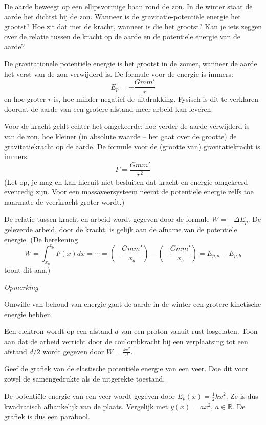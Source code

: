 \documentclass{ximera}
\begin{document}
\begin{exercise}
	De aarde beweegt op een ellipsvormige baan rond de zon. In de winter staat de aarde het dichtst bij de zon. Wanneer is de gravitatie-potentiële energie het grootst? Hoe zit dat met de kracht, wanneer is die het grootst? Kan je iets zeggen over de relatie tussen de kracht op de aarde en de potentiële energie van de aarde?

	\begin{oplossing}
		De gravitationele potentiële energie is het grootst in de zomer, wanneer de aarde het verst van de zon verwijderd is. De formule voor de energie is immers:
		\[
			E_p=-\frac{Gmm'}{r}
		\]
		en hoe groter $r$ is, hoe minder negatief de uitdrukking. Fysisch is dit te verklaren doordat de aarde van een grotere afstand meer arbeid kan leveren.

		Voor de kracht geldt echter het omgekeerde; hoe verder de aarde verwijderd is van de zon, hoe kleiner (in absolute waarde -- het gaat over de grootte) de gravitatiekracht op de aarde. De formule voor de (grootte van) gravitatiekracht is immers:
		\[
			F=\frac{Gmm'}{r^2}
		\]
		(Let op, je mag en kan hieruit niet besluiten dat kracht en energie omgekeerd evenredig zijn. Voor een massaveersysteem neemt de potentiële energie zelfs toe naarmate de veerkracht groter wordt.)

		De relatie tussen kracht en arbeid wordt gegeven door de formule $W=-\Delta E_p$. De geleverde arbeid, door de kracht, is gelijk aan de afname van de potentiële energie. (De berekening
		\[
			W=\int_{x_a}^{x_b}F(x)dx=\cdots=\left(-\frac{Gmm'}{x_a}\right)-\left(-\frac{Gmm'}{x_b}\right)=E_{p,a}-E_{p,b}
		\]
		toont dit aan.)

		\emph{Opmerking}

		Omwille van behoud van energie gaat de aarde in de winter een grotere kinetische energie hebben.
	\end{oplossing}
\end{exercise}

\begin{exercise}
	Een elektron wordt op een afstand $d$ van een proton vanuit rust losgelaten. Toon aan dat de arbeid verricht door de coulombkracht bij een verplaatsing tot een afstand $d/2$ wordt gegeven door $W=\frac{ke^2}{d}$.
\end{exercise}

\begin{exercise}
	Geef de grafiek van de elastische potentiële energie van een veer. Doe dit voor zowel de samengedrukte als de uitgerekte toestand.

	\begin{oplossing}
		De potentiële energie van een veer wordt gegeven door
		$E_p(x)=\frac{1}{2}kx^2$. Ze is dus kwadratisch afhankelijk van de plaats. Vergelijk met $y(x)=ax^2,\,a\in\mathbb{R}$. De grafiek is dus een parabool.
	\end{oplossing}
\end{exercise}
\end{document}

